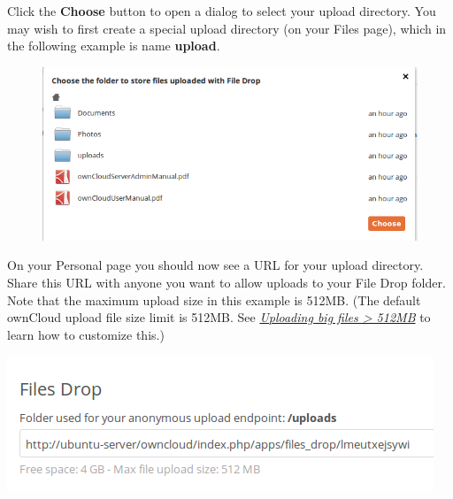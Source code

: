 \documentclass[letterpaper,10pt,english]{sphinxmanual}
\begin{document}
Click the \textbf{Choose} button to open a dialog to select your upload directory.
You may wish to first create a special upload directory (on your Files page),
which in the following example is name \textbf{upload}.
\begin{figure}[htbp]
\centering

\includegraphics{files-drop-3.png}
\end{figure}

On your Personal page you should now see a URL for your upload directory. Share
this URL with anyone you want to allow uploads to your File Drop folder. Note
that the maximum upload size in this example is 512MB. (The default
ownCloud upload file size limit is 512MB. See
{\hyperref[configuration_files/big_file_upload_configuration::doc]{\emph{Uploading big files \textgreater{} 512MB}}} to learn how to
customize this.)

\includegraphics{files-drop-4.png}
\end{document}
